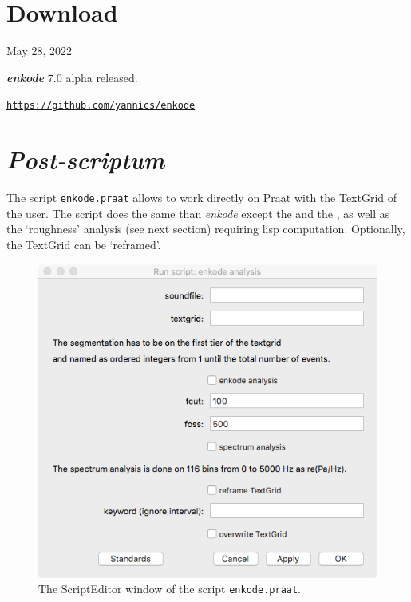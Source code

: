 \section{Download}

May 28, 2022

\textsl{\textbf{enkode}} 7.0 alpha released.

\href{https://github.com/yannics/enkode}{\texttt{\small https://github.com/yannics/enkode}} 

%


\section{\textit{Post-scriptum}}
\label{enkps}
The script \texttt{enkode.praat} allows to work directly on Praat with the TextGrid of the user. The script does the same than \textsl{enkode} except the \textsl{} and the \textsl{}, as well as the `roughness' analysis (see next section) requiring lisp computation.
Optionally,  the TextGrid can be `reframed'.

\smallskip

\makeatletter
\setlength{\@fptop}{0pt}
\makeatother

\begin{figure}[!hbt]
	\begin{center}
		\includegraphics[scale=0.5]{img/5612}
		\caption{The ScriptEditor window of the script \texttt{enkode.praat}.}
		\label{fig:praat}
	\end{center}
\end{figure}

